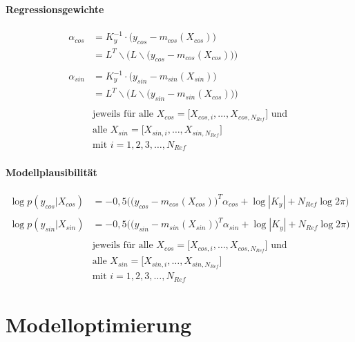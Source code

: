 \paragraph*{Regressionsgewichte}


\begin{align}\label{eq:gprweights}
	\alpha_{cos} &= K_y^{-1} \cdot \big( y_{cos} - m_{cos}(X_{cos}) \big) \nonumber \\
				 &= L^T \backslash \Big(L \backslash \big( y_{cos} - m_{cos}(X_{cos}) \big) \Big) \nonumber \\
	\\
	\alpha_{sin} &= K_y^{-1} \cdot \big( y_{sin} - m_{sin}(X_{sin}) \big) \nonumber \\
				 &= L^T \backslash \Big(L \backslash \big( y_{sin} - m_{sin}(X_{cos}) \big) \Big) \nonumber \\
	\nonumber \\
& \text{jeweils für alle } X_{cos} = \big[ X_{cos,i},\dots, X_{cos,N_{Ref}} \big] \text{ und } \nonumber \\
& \text{alle } X_{sin} = \big[ X_{sin,i},\dots, X_{sin,N_{Ref}} \big] \nonumber \\
& \text{mit } i = 1,2,3,\ldots,N_{Ref} \nonumber
\end{align}


\paragraph*{Modellplausibilität}


\begin{align}\label{eq:likelihoods}
	\log p(y_{cos}|X_{cos}) &= -0,5 \Big( \big( y_{cos} - m_{cos}(X_{cos}) \big)^T \alpha_{cos} + \log|K_y| + N_{Ref} \log 2\pi  \Big) \nonumber \\
	\\
	\log p(y_{sin}|X_{sin}) &= -0,5 \Big( \big( y_{sin} - m_{sin}(X_{sin}) \big)^T \alpha_{sin} + \log|K_y| + N_{Ref} \log 2\pi  \Big) \nonumber \\
	\nonumber \\
& \text{jeweils für alle } X_{cos} = \big[ X_{cos,i},\dots, X_{cos,N_{Ref}} \big] \text{ und } \nonumber \\
& \text{alle } X_{sin} = \big[ X_{sin,i},\dots, X_{sin,N_{Ref}} \big] \nonumber \\
& \text{mit } i = 1,2,3,\ldots,N_{Ref} \nonumber	
\end{align}


\clearpage


\section{Modelloptimierung}\label{sec:gpropt}


